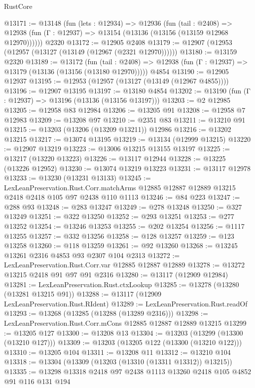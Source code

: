 \begin{lexlean}{RustCore}
\begin{coremodule}
@13171 := @13148
    (fun (lets : @12934) =>
    @12936
      (fun (tail : @2408) =>
      @12938 (fun (Γ : @12937) => @13154 (@13136 (@13156 (@13159 @12968 @12970))))))
    @2320
@13172 := @12905 @2408
@13179 := @12907 (@12953 (@12957 (@13127 (@13149 (@12967 (@2321 @12970))))))
@13180 := @13159 @2320
@13189 := @13172
    (fun (tail : @2408) => @12938 (fun (Γ : @12937) => @13179 (@13136 (@13156 (@13180 @12970)))))
    @4854
@13190 := @12905 @12937
@13195 := @12953 (@12957 (@13127 (@13149 (@12967 @4855))))
@13196 := @12907 @13195
@13197 := @13180 @4854
@13202 := @13190 (fun (Γ : @12937) => @13196 (@13136 (@13156 @13197)))
@13203 := @2 @12985
@13205 := @12958 @83 @12984
@13206 := @13205 @91
@13208 := @12958 @7 @12983
@13209 := @13208 @97
@13210 := @2351 @83
@13211 := @13210 @91
@13215 := @13203 (@13206 (@13209 @13211)) @12986
@13216 := @13202 @13215
@13217 := @13074 @13195
@13219 := @13134 (@12999 @13215)
@13220 := @12907 @13219
@13223 := @13006 @13215 @13155 @13197
@13225 := @13217 (@13220 @13223)
@13226 := @13117 @12944
@13228 := @13225 (@13226 @12952)
@13230 := @13074 @13219 @13223
@13231 := @13117 @12978
@13233 := @13230 (@13231 @13133)
@13245 := LexLeanPreservation.Rust.Corr.matchArms
    @12885
    @12887
    @12889
    @13215
    @2418
    @2418
    @105
    @97
    @2438
    @110
    @1113
@13246 := @84 @223
@13247 := @288 @93
@13248 := @283 @13247
@13249 := @278 @13248
@13250 := @327 @13249
@13251 := @322 @13250
@13252 := @293 @13251
@13253 := @277 @13252
@13254 := @13246 @13253
@13255 := @202 @13254
@13256 := @1117 @13255
@13257 := @332 @13256
@13258 := @128 @13257
@13259 := @123 @13258
@13260 := @118 @13259
@13261 := @92 @13260
@13268 := @13245 @13261 @2316 @4853 @93 @2307 @104 @2313
@13272 := LexLeanPreservation.Rust.Corr.var @12885 @12887 @12889
@13278 := @13272 @13215 @2418 @91 @97 @91 @2316
@13280 := @13117 (@12909 @12984)
@13281 := LexLeanPreservation.Rust.ctxLookup
@13285 := @13278 (@13280 (@13281 @13215 @91))
@13288 := @13117 (@12909 LexLeanPreservation.Rust.RIdent)
@13289 := LexLeanPreservation.Rust.readOf
@13293 := @13268 (@13285 (@13288 (@13289 @2316)))
@13298 := LexLeanPreservation.Rust.Corr.mCons @12885 @12887 @12889 @13215
@13299 := @13205 @127
@13300 := @13208 @13
@13304 := @13203 (@13299 (@13300 (@13210 @127)))
@13309 := @13203 (@13205 @122 (@13300 (@13210 @122)))
@13310 := @13205 @104
@13311 := @13208 @11
@13312 := @13210 @104
@13318 := @13304 (@13309 (@13203 (@13310 (@13311 @13312)) @13215))
@13335 := @13298
    @13318
    @2418
    @97
    @2438
    @1113
    @13260
    @2418
    @105
    @4852
    @91
    @116
    @131
    @194

\end{coremodule}
\end{lexlean}
